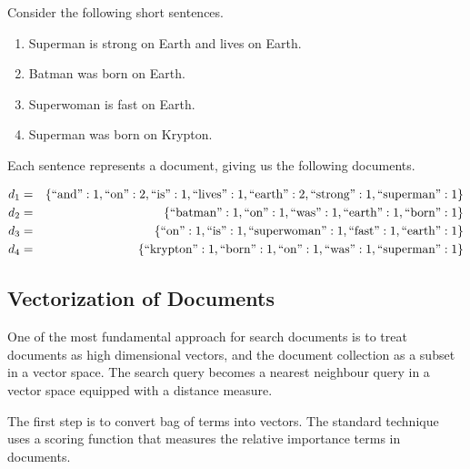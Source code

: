 	\begin{ex}
	\label{ex:superhero-documents}
		Consider the following short sentences.
		
		\begin{enumerate}
			\item Superman is strong on Earth and lives on Earth.
			\item Batman was born on Earth.
			\item Superwoman is fast on Earth.
			\item Superman was born on Krypton.
		\end{enumerate}
		
		Each sentence represents a document, giving us the following documents.
		
		\begin{eqnarray*}
			d_1 &=& \left\{\textrm{``and''}: 1, \textrm{``on''}: 2, \textrm{``is''}: 1, \textrm{``lives''}: 1, \textrm{``earth''}: 2, \textrm{``strong''}: 1, \textrm{``superman''}: 1\right\} \\
			d_2 &=& \left\{\textrm{``batman''}: 1, \textrm{``on''}: 1, \textrm{``was''}: 1, \textrm{``earth''}: 1, \textrm{``born''}: 1\right\} \\
			d_3 &=& \left\{\textrm{``on''}: 1, \textrm{``is''}: 1, \textrm{``superwoman''}: 1, \textrm{``fast''}: 1, \textrm{``earth''}: 1\right\} \\
			d_4 &=& \left\{\textrm{``krypton''}: 1, \textrm{``born''}: 1, \textrm{``on''}: 1, \textrm{``was''}: 1, \textrm{``superman''}: 1\right\} \\
		\end{eqnarray*}
	\end{ex}
	
	\subsection{Vectorization of Documents}
	\label{sec:vectorization-of-documents}
		One of the most fundamental approach for search documents is to treat documents as high dimensional vectors, and the document collection as a subset in a vector space.  The search query becomes a nearest neighbour query in a vector space equipped with a distance measure.
		
		The first step is to convert bag of terms into vectors.  The standard technique \cite{ir-08} uses a scoring function that measures the relative importance terms in documents.
		
